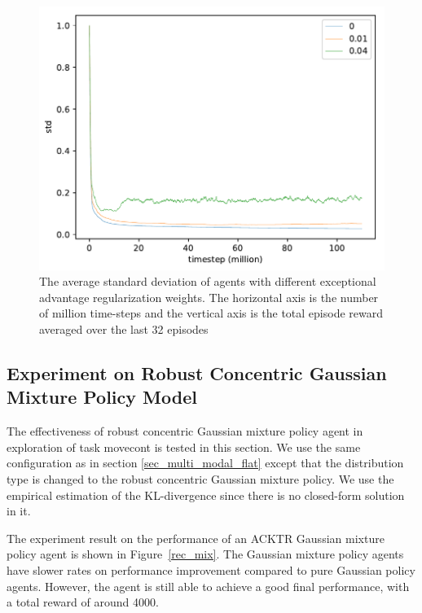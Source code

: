 \begin{figure}[!htbp]
	\includegraphics[width=\textwidth]{images/rec_180606_std_adv_reg.pdf}
	\centering
	\caption{The average standard deviation of agents with different exceptional advantage regularization weights. The horizontal axis is the number of million time-steps and the vertical axis is the total episode reward averaged over the last 32 episodes}\label{rec_std_adv_reg}
\end{figure}

\subsection{Experiment on Robust Concentric Gaussian Mixture Policy Model}
The effectiveness of robust concentric Gaussian mixture policy agent in exploration of task movecont is tested in this section. We use the same configuration as in section \ref{sec_multi_modal_flat} except that the distribution type is changed to the robust concentric Gaussian mixture policy. We use the empirical estimation of the KL-divergence since there is no closed-form solution in it.

The experiment result on the performance of an ACKTR Gaussian mixture policy agent is shown in Figure~\ref{rec_mix}. The Gaussian mixture policy agents have slower rates on performance improvement compared to pure Gaussian policy agents. However, the agent is still able to achieve a good final performance, with a total reward of around 4000.

